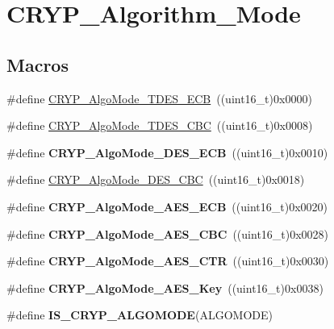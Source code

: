 \hypertarget{group___c_r_y_p___algorithm___mode}{}\section{C\+R\+Y\+P\+\_\+\+Algorithm\+\_\+\+Mode}
\label{group___c_r_y_p___algorithm___mode}
\subsection*{Macros}
\begin{DoxyCompactItemize}
\item 
\#define \hyperlink{group___c_r_y_p___algorithm___mode_gac032fa07d83dc55d7babd4971d96d3cd}{C\+R\+Y\+P\+\_\+\+Algo\+Mode\+\_\+\+T\+D\+E\+S\+\_\+\+E\+C\+B}~((uint16\+\_\+t)0x0000)
\item 
\#define \hyperlink{group___c_r_y_p___algorithm___mode_ga75c9e649ad171d1ee97b60b237946fc3}{C\+R\+Y\+P\+\_\+\+Algo\+Mode\+\_\+\+T\+D\+E\+S\+\_\+\+C\+B\+C}~((uint16\+\_\+t)0x0008)
\item 
\hypertarget{group___c_r_y_p___algorithm___mode_gad7d3f6cbe5bdc4429fb6d793934a1f67}{}\#define {\bfseries C\+R\+Y\+P\+\_\+\+Algo\+Mode\+\_\+\+D\+E\+S\+\_\+\+E\+C\+B}~((uint16\+\_\+t)0x0010)\label{group___c_r_y_p___algorithm___mode_gad7d3f6cbe5bdc4429fb6d793934a1f67}

\item 
\#define \hyperlink{group___c_r_y_p___algorithm___mode_ga54e4fe95b772fc6ab6015761d746ef9f}{C\+R\+Y\+P\+\_\+\+Algo\+Mode\+\_\+\+D\+E\+S\+\_\+\+C\+B\+C}~((uint16\+\_\+t)0x0018)
\item 
\hypertarget{group___c_r_y_p___algorithm___mode_ga848f43e8f8c3dc5c6703e7bb5564d371}{}\#define {\bfseries C\+R\+Y\+P\+\_\+\+Algo\+Mode\+\_\+\+A\+E\+S\+\_\+\+E\+C\+B}~((uint16\+\_\+t)0x0020)\label{group___c_r_y_p___algorithm___mode_ga848f43e8f8c3dc5c6703e7bb5564d371}

\item 
\hypertarget{group___c_r_y_p___algorithm___mode_ga323e924328e277dc86d4d12711671f89}{}\#define {\bfseries C\+R\+Y\+P\+\_\+\+Algo\+Mode\+\_\+\+A\+E\+S\+\_\+\+C\+B\+C}~((uint16\+\_\+t)0x0028)\label{group___c_r_y_p___algorithm___mode_ga323e924328e277dc86d4d12711671f89}

\item 
\hypertarget{group___c_r_y_p___algorithm___mode_gaff5449a5005dca43408b5ecc7c7a44ac}{}\#define {\bfseries C\+R\+Y\+P\+\_\+\+Algo\+Mode\+\_\+\+A\+E\+S\+\_\+\+C\+T\+R}~((uint16\+\_\+t)0x0030)\label{group___c_r_y_p___algorithm___mode_gaff5449a5005dca43408b5ecc7c7a44ac}

\item 
\hypertarget{group___c_r_y_p___algorithm___mode_gaa96d12461096fba7b3e7a25f036e0cf4}{}\#define {\bfseries C\+R\+Y\+P\+\_\+\+Algo\+Mode\+\_\+\+A\+E\+S\+\_\+\+Key}~((uint16\+\_\+t)0x0038)\label{group___c_r_y_p___algorithm___mode_gaa96d12461096fba7b3e7a25f036e0cf4}

\item 
\#define {\bfseries I\+S\+\_\+\+C\+R\+Y\+P\+\_\+\+A\+L\+G\+O\+M\+O\+D\+E}(A\+L\+G\+O\+M\+O\+D\+E)
\end{DoxyCompactItemize}



